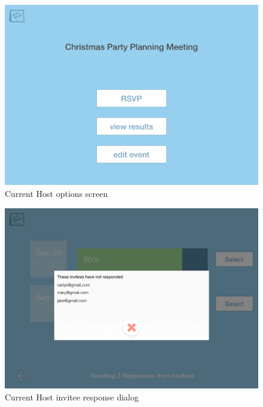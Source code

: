 \documentclass{sigchi}
\begin{document}
\begin{figure}
  \centering
  \includegraphics[width=1.75\columnwidth]{Mockup/Options}
  \caption{Current Host options screen}
\end{figure}

\begin{figure}
  \centering
  \includegraphics[width=1.75\columnwidth]{Mockup/ResultsInviteesDialog}
  \caption{Current Host invitee response dialog}
\end{figure}
\end{document}
